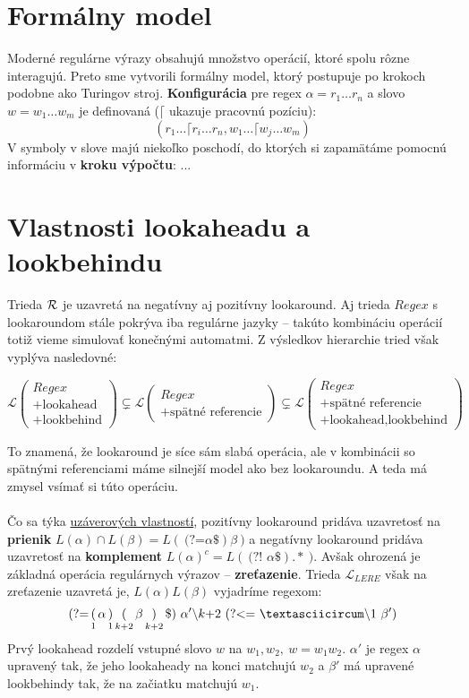 \documentclass[myposter,portrait,plainboxedsections]{sciposter}
\def\R{{\cal R}} %
\def\L{\mathscr{L}} %
\def\re{Regex}
\def\lel{\mathscr{L}_{LERE}}
\def\lookahead{\text{(?=}}
\def\nlookahead{\text{(?!~}}
\def\lookbehind{\text{(?\textless =}}
\def\mysection#1{
{\color{sectionCol}\section*{\sc\bfseries #1}}}
\begin{document}
\begin{multicols*}{3}
\mysection{Formálny model} 
Moderné regulárne výrazy obsahujú množstvo operácií, ktoré spolu rôzne interagujú. Preto sme vytvorili formálny model, ktorý postupuje po krokoch podobne ako Turingov stroj. \textbf{Konfigurácia} pre regex $\alpha=r_1\dots r_n$ a slovo $w=w_1\dots w_m$ je definovaná ($\lceil$ ukazuje pracovnú pozíciu):
$$(r_1\dots \lceil r_i \dots r_n, w_1 \dots \lceil w_j \dots w_m)$$
V symboly v slove majú niekoľko poschodí, do ktorých si zapamätáme pomocnú informáciu v \textbf{kroku výpočtu}: ...



\mysection{Vlastnosti lookaheadu a lookbehindu}

Trieda $\R$ je uzavretá na negatívny aj pozitívny lookaround. Aj trieda $\re$ s lookaroundom stále pokrýva iba regulárne jazyky -- takúto kombináciu operácií totiž vieme simulovať konečnými automatmi. Z výsledkov hierarchie tried však vyplýva nasledovné:

$$ \L \begin{pmatrix}
\re \\
\text{+lookahead} \\
\text{+lookbehind}
\end{pmatrix} 
\subsetneq
\L \begin{pmatrix}
\re \\
\text{+spätné referencie}
\end{pmatrix} 
\subsetneq
\L \begin{pmatrix}
\re \\
\text{+spätné referencie} \\
\text{+lookahead,lookbehind}
\end{pmatrix} 
$$

To znamená, že lookaround je síce sám slabá operácia, ale v kombinácii so spätnými referenciami máme silnejší model ako bez lookaroundu. A teda má zmysel vsímať si túto operáciu.
\\ \\ 
Čo sa týka \underline{uzáverových vlastností}, pozitívny lookaround pridáva uzavretosť na \textbf{prienik} $L(\alpha)\cap L(\beta) = L(~\lookahead\alpha\$)\beta~)$ a negatívny lookaround pridáva uzavretosť na \textbf{komplement} $L(\alpha)^c = L(~ \nlookahead \alpha \$).* ~)$. Avšak ohrozená je základná operácia regulárnych výrazov -- \textbf{zreťazenie}. Trieda $\lel$ však na zreťazenie uzavretá je, $L(\alpha)L(\beta)$ vyjadríme regexom:
$$
\lookahead \mathop(_1 \alpha \mathop)_1 \mathop(_{k+2}\beta \mathop)_{k+2} \mathdollar) ~\alpha ' \backslash k\text{+2}~ \lookbehind ~\textasciicircum\backslash 1~\beta ')
$$
Prvý lookahead rozdelí vstupné slovo $w$ na $w_1,w_2,~w=w_1w_2$. $\alpha'$ je regex $\alpha$ upravený tak, že jeho lookaheady na konci matchujú $w_2$ a $\beta'$ má upravené lookbehindy tak, že na začiatku matchujú $w_1$. \cite{mojaBak}
 

\end{multicols*}
\end{document}
